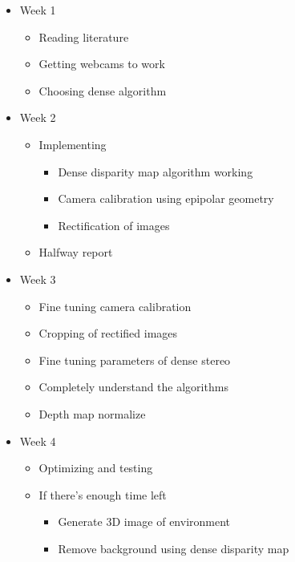 \documentclass[a4paper]{article}
\begin{document}
\begin{itemize}
  \item Week 1
    \begin{itemize}
      \item Reading literature
      \item Getting webcams to work
      \item Choosing dense algorithm
    \end{itemize}
  \item Week 2
    \begin{itemize}
      \item Implementing
        \begin{itemize}
          \item Dense disparity map algorithm working
          \item Camera calibration using epipolar geometry
          \item Rectification of images
        \end{itemize}
      \item Halfway report
    \end{itemize}
    
  \item Week 3
    \begin{itemize}
    \item Fine tuning camera calibration
    \item Cropping of rectified images
    \item Fine tuning parameters of dense stereo
    \item Completely understand the algorithms
    \item Depth map normalize
    \end{itemize}

  \item Week 4
    \begin{itemize}
      \item Optimizing and testing
      \item If there's enough time left
        \begin{itemize}
          \item Generate 3D image of environment
          \item Remove background using dense disparity map
        \end{itemize}
    \end{itemize}
\end{itemize}
\end{document}

